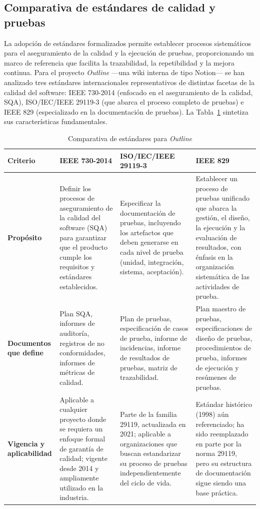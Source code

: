 \documentclass[12pt, letterpaper]{article}
\begin{document}
\subsection{Comparativa de estándares de calidad y pruebas}

La adopción de estándares formalizados permite establecer procesos sistemáticos para el aseguramiento de la calidad y la ejecución de pruebas, proporcionando un marco de referencia que facilita la trazabilidad, la repetibilidad y la mejora continua. Para el proyecto \textit{Outline} —una wiki interna de tipo Notion— se han analizado tres estándares internacionales representativos de distintas facetas de la calidad del software: IEEE 730-2014 (enfocado en el aseguramiento de la calidad, SQA), ISO/IEC/IEEE 29119-3 (que abarca el proceso completo de pruebas) e IEEE 829 (especializado en la documentación de pruebas). La Tabla~\ref{tab:estandares} sintetiza sus características fundamentales.

\begin{table}[H]
\centering
\caption{Comparativa de estándares para \textit{Outline}}
\label{tab:estandares}
\begin{tabular}{|>{\raggedright\arraybackslash}p{3cm}|>{\raggedright\arraybackslash}p{3.2cm}|>{\raggedright\arraybackslash}p{3.2cm}|>{\raggedright\arraybackslash}p{3.2cm}|}
\hline
\textbf{Criterio} & \textbf{IEEE 730-2014} & \textbf{ISO/IEC/IEEE 29119-3} & \textbf{IEEE 829} \\
\hline
\textbf{Propósito} & Definir los procesos de aseguramiento de la calidad del software (SQA) para garantizar que el producto cumple los requisitos y estándares establecidos. & Especificar la documentación de pruebas, incluyendo los artefactos que deben generarse en cada nivel de prueba (unidad, integración, sistema, aceptación). & Establecer un proceso de pruebas unificado que abarca la gestión, el diseño, la ejecución y la evaluación de resultados, con énfasis en la organización sistemática de las actividades de prueba. \\
\hline
\textbf{Documentos que define} & Plan SQA, informes de auditoría, registros de no conformidades, informes de métricas de calidad. & Plan de pruebas, especificación de casos de prueba, informe de incidencias, informe de resultados de pruebas, matriz de trazabilidad. & Plan maestro de pruebas, especificaciones de diseño de pruebas, procedimientos de prueba, informes de ejecución y resúmenes de pruebas. \\
\hline
\textbf{Vigencia y aplicabilidad} & Aplicable a cualquier proyecto donde se requiera un enfoque formal de garantía de calidad; vigente desde 2014 y ampliamente utilizado en la industria. & Parte de la familia 29119, actualizada en 2021; aplicable a organizaciones que buscan estandarizar su proceso de pruebas independientemente del ciclo de vida. & Estándar histórico (1998) aún referenciado; ha sido reemplazado en parte por la norma 29119, pero su estructura de documentación sigue siendo una base práctica. \\
\hline
\end{tabular}
\end{table}
\end{document}
